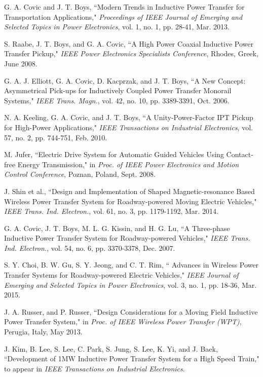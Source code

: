 \documentclass[twocolumn,10pt]{IEEEtran}
\begin{document}
\begin{thebibliography}{99}
G. A. Covic and J. T.  Boys, ``Modern Trends in Inductive Power Transfer for Transportation Applications,"  \emph{Proceedings of IEEE Journal of  Emerging and Selected Topics in Power Electronics}, vol. 1, no. 1, pp. 28-41, Mar. 2013. 

 S. Raabe, J. T. Boys, and G. A. Covic, ``A High Power Coaxial Inductive Power Transfer Pickup," \emph{IEEE Power Electronics Specialists Conference}, Rhodes, Greek, June 2008. 

  G. A. J. Elliott, G. A. Covic, D. Kacprzak, and J. T. Boys, ``A New Concept: Asymmetrical Pick-ups for Inductively Coupled Power Transfer Monorail Systems," \emph{IEEE Trans. Magn.}, vol. 42, no. 10, pp. 3389-3391, Oct. 2006.

 

 N. A. Keeling, G. A. Covic, and J. T. Boys, ``A Unity-Power-Factor IPT Pickup for High-Power Applications," 
\emph{IEEE Transactions on Industrial Electronics}, vol. 57, no. 2, pp. 744-751, Feb. 2010.

 M. Jufer, ``Electric Drive System for Automatic Guided Vehicles Using Contact-free Energy Transmission," in \emph{Proc. of IEEE
Power Electronics and Motion Control Conference},  Poznan, Poland,  Sept. 2008. 

 J. Shin et al., ``Design and Implementation of Shaped Magnetic-resonance Based Wireless Power Transfer System for Roadway-powered Moving Electric Vehicles," \emph{IEEE Trans. Ind. Electron.}, vol. 61, no. 3, pp. 1179-1192, Mar. 2014.

 G. A. Covic, J. T. Boys, M. L. G. Kissin, and H. G. Lu, ``A Three-phase Inductive Power Transfer System for Roadway-powered Vehicles," \emph{IEEE Trans. Ind. Electron.}, vol. 54, no. 6, pp. 3370-3378, Dec. 2007.

S. Y. Choi, B. W. Gu, S. Y. Jeong, and C. T. Rim, ``
Advances in Wireless Power Transfer Systems for Roadway-powered Electric Vehicles,"  \emph{IEEE Journal of Emerging and Selected Topics in Power Electronics}, vol. 3, no. 1, pp. 18-36, Mar. 2015.

 

J. A. Russer, and P. Russer, ``Design Considerations for a Moving Field Inductive Power Transfer System," in \emph{Proc. of IEEE Wireless Power Transfer (WPT)}, Perugia, Italy, May 2013.

J. Kim, B. Lee, S. Lee, C. Park,  S. Jung,   S. Lee,  K. Yi, and J. Baek, ``Development of 1MW Inductive Power Transfer System for a High Speed Train," to appear in \emph{IEEE Transactions on Industrial Electronics}.
  

\end{thebibliography}
\end{document}
